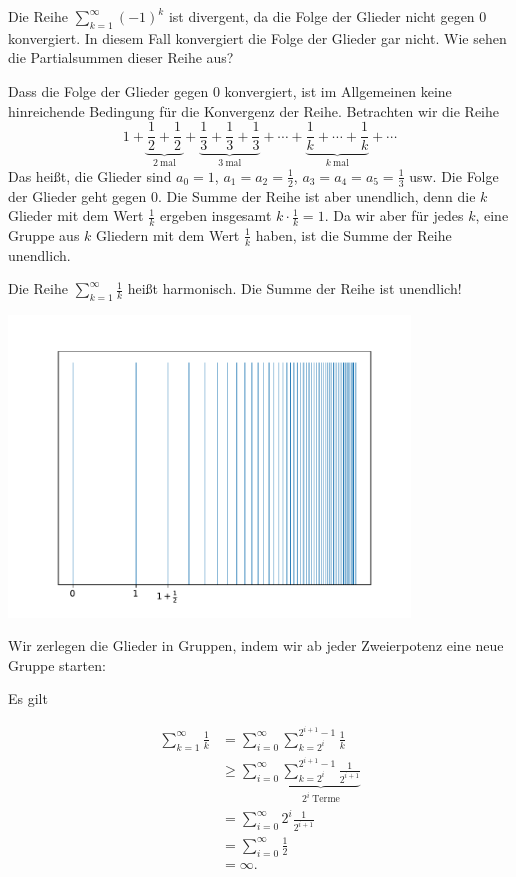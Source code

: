 \begin{bsp} 
	Die Reihe $\sum_{k=1}^\infty (-1)^k$ ist divergent, da die Folge der Glieder nicht gegen $0$ konvergiert. In diesem Fall konvergiert die Folge der Glieder gar nicht. Wie sehen die Partialsummen dieser Reihe aus? 
\end{bsp} 


\begin{bsp} 
	Dass die Folge der Glieder gegen $0$ konvergiert, ist im Allgemeinen keine hinreichende Bedingung für die Konvergenz der Reihe. Betrachten wir die Reihe 
	\[
	1 + \underbrace{\frac{1}{2} + \frac{1}{2}}_{2 \ \text{mal}} + \underbrace{\frac{1}{3} + \frac{1}{3}+ \frac{1}{3}}_{3 \ \text{mal}}  +  \cdots +  \underbrace{\frac{1}{k} + \cdots + \frac{1}{k}}_{k \ \text{mal}} + \cdots 
	\]
	Das heißt, die Glieder sind $a_0=1$, $a_1 = a_2 = \frac{1}{2}$, $a_3=a_4=a_5 = \frac{1}{3}$ usw. Die Folge der Glieder geht gegen $0$. Die Summe der Reihe ist aber unendlich, denn die $k$ Glieder mit dem Wert $\frac{1}{k}$ ergeben insgesamt $k \cdot \frac{1}{k} = 1$. Da wir aber für jedes $k$, eine Gruppe aus $k$ Gliedern mit dem Wert $\frac{1}{k}$ haben, ist die Summe der Reihe unendlich. 
\end{bsp} 

\begin{bsp} 
	Die Reihe $\sum_{k=1}^\infty \frac{1}{k}$ heißt harmonisch. Die Summe der Reihe ist unendlich! 
	
	\begin{center}
		\includegraphics[width=0.8\textwidth]{pics/harmonic.pdf}
	\end{center}
	
	Wir zerlegen die Glieder in Gruppen, indem wir ab jeder Zweierpotenz eine neue Gruppe starten: 
 
	 Es gilt 
	
	\begin{align*}
		\sum_{k=1}^\infty \frac{1}{k} & = \sum_{i=0}^\infty \sum_{k=2^i}^{2^{i+1}-1} \frac{1}{k}
		\\ & \ge \sum_{i=0}^\infty \underbrace{\sum_{k=2^i}^{2^{i+1}-1} \frac{1}{2^{i+1}}}_{2^i \ \text{Terme}}
		\\ & = \sum_{i=0}^\infty 2^i \frac{1}{2^{i+1}}
		\\ & = \sum_{i=0}^\infty \frac{1}{2} 
		\\ & = \infty.  
	\end{align*}
\end{bsp} 

